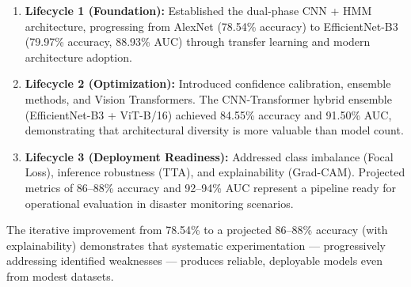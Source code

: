 \documentclass[11pt]{article}
\begin{document}
\begin{enumerate}
    \item \textbf{Lifecycle 1 (Foundation):} Established the dual-phase CNN + HMM architecture, progressing from AlexNet (78.54\% accuracy) to EfficientNet-B3 (79.97\% accuracy, 88.93\% AUC) through transfer learning and modern architecture adoption.

    \item \textbf{Lifecycle 2 (Optimization):} Introduced confidence calibration, ensemble methods, and Vision Transformers. The CNN-Transformer hybrid ensemble (EfficientNet-B3 + ViT-B/16) achieved 84.55\% accuracy and 91.50\% AUC, demonstrating that architectural diversity is more valuable than model count.

    \item \textbf{Lifecycle 3 (Deployment Readiness):} Addressed class imbalance (Focal Loss), inference robustness (TTA), and explainability (Grad-CAM). Projected metrics of 86--88\% accuracy and 92--94\% AUC represent a pipeline ready for operational evaluation in disaster monitoring scenarios.
\end{enumerate}

\noindent The iterative improvement from 78.54\% to a projected 86--88\% accuracy (with explainability) demonstrates that systematic experimentation --- progressively addressing identified weaknesses --- produces reliable, deployable models even from modest datasets.
\end{document}
